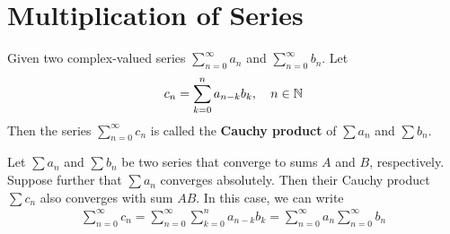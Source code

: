 \documentclass[thmcnt=section, 12pt]{my-elegantbook}
\begin{document}

\section{Multiplication of Series}

\begin{definition}
    Given two complex-valued series $\sum_{n=0}^\infty a_n$ and $\sum_{n=0}^\infty b_n$. Let
    \begin{align*}
        c_n = \sum_{k=0}^{n} a_{n-k} b_k,
        \quad n \in \mathbb{N}
    \end{align*}
    Then the series $\sum_{n=0}^\infty c_n$ is called the \textbf{Cauchy product} of $\sum a_n$ and $\sum b_n$.
\end{definition}

\begin{theorem}[Mertens] \label{thm:67}
    Let $\sum a_n$ and $\sum b_n$ be two series that converge to sums $A$ and $B$, respectively. Suppose further that $\sum a_n$ converges absolutely. Then their Cauchy product $\sum c_n$ also converges with sum $AB$. In this case, we can write
    \begin{align*}
        \sum_{n=0}^\infty c_n
        = \sum_{n=0}^\infty \sum_{k=0}^n a_{n-k} b_k
        = \sum_{n=0}^\infty a_n
        \sum_{n=0}^\infty b_n
    \end{align*}
\end{theorem}
\end{document}
